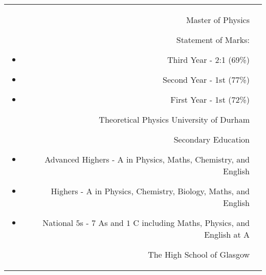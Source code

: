 \documentclass[10pt]{article} %
\begin{document}
\begin{paracol}{2}



\begin{supertabular}{rp{6.7cm}} %

	
	{Master of Physics} %
    {Statement of Marks:
        \begin{itemize}[noitemsep]
        \item Third Year - 2:1 (69\%)
        \item Second Year - 1st (77\%)
        \item First Year - 1st (72\%)
    \end{itemize}\vspace{-10pt}} %
	{Theoretical Physics} %
	{University of Durham} %
	
	
	{Secondary Education} %
	{} %
    {\vspace{-5pt}
     \begin{itemize}[noitemsep]
        \item Advanced Highers - A in Physics, Maths, Chemistry, and English
        \item Highers - A in Physics, Chemistry, Biology, Maths, and English
        \item National $5$s - $7$ As and $1$ C including Maths, Physics, and English at A
     \end{itemize}\vspace{-10pt}} %
     {The High School of Glasgow} %
	

\end{supertabular}



\end{paracol}
\end{document}

